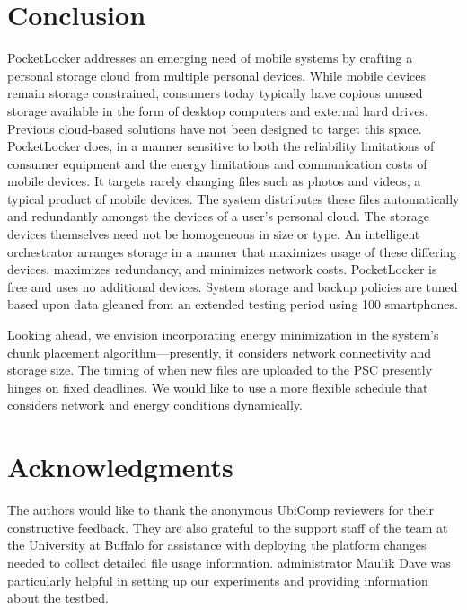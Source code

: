 
\section{Conclusion}
\label{sec-conclusion}

PocketLocker addresses an emerging need of mobile systems by crafting a
personal storage cloud from multiple personal devices.  While mobile devices
remain storage constrained, consumers today typically have copious unused
storage available in the form of desktop computers and external hard drives.
Previous cloud-based solutions have not been designed to target this space.
PocketLocker does, in a manner sensitive to both the reliability limitations of
consumer equipment and the energy limitations and communication costs of mobile
devices. It targets rarely changing files such as photos and videos, a typical
product of mobile devices.  The system distributes these files automatically
and redundantly amongst the devices of a user's personal cloud. The storage
devices themselves need not be homogeneous in size or type.  An intelligent
orchestrator arranges storage in a manner that maximizes usage of these
differing devices, maximizes redundancy, and minimizes network costs.
PocketLocker is free and uses no additional devices.  System storage and backup
policies are tuned based upon data gleaned from an extended testing period
using 100 smartphones.

Looking ahead, we envision incorporating energy minimization in the system's
chunk placement algorithm---presently, it considers network connectivity and
storage size.  The timing of when new files are uploaded to the PSC presently
hinges on fixed deadlines.  We would like to use a more flexible schedule that
considers network and energy conditions dynamically.

\section*{Acknowledgments}

The authors would like to thank the anonymous UbiComp reviewers for their
constructive feedback. They are also grateful to the support staff of the
\PhoneLab{} team at the University at Buffalo for assistance with deploying the
platform changes needed to collect detailed file usage information. \PhoneLab{}
administrator Maulik Dave was particularly helpful in setting up our
experiments and providing information about the testbed.


